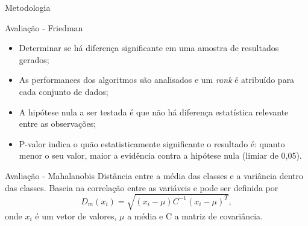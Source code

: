 \documentclass{beamer}
\begin{document}
\begin{frame}{Metodologia}
\setlength\leftmargini{1em}
\begin{block}{Avaliação - Friedman}
\begin{itemize}
\item Determinar se há diferença significante em uma amostra de resultados gerados;
\item As performances dos algoritmos são analisados e um \textit{rank} é atribuído para cada conjunto de dados;
\item A hipótese nula a ser testada é que não há diferença estatística relevante entre as observações;
\item P-valor indica o quão estatisticamente significante o resultado é: quanto menor o seu valor, maior a evidência contra a hipótese nula (limiar de 0,05).
\end{itemize}
\end{block}
\end{frame}
\begin{frame}{}
\setlength\leftmargini{1em}
\begin{block}{Avaliação - Mahalanobis}  %
Distância entre a média das classes e a variância dentro das classes. Baseia na correlação entre as variáveis e pode ser definida por
\begin{equation*}
  D_m(x_i) = \sqrt{(x_i - \mu)C^{-1}(x_i-\mu)^T},
\end{equation*}
\noindent onde $x_i$ é um vetor de valores, $\mu$ a média e C a matriz de covariância.
\end{block}
\end{frame}
\end{document}
